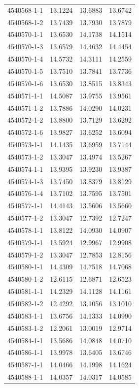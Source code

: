 \begin{longtable}{lrrr}
4540568-1-1 & 13.1224 & 13.6883 & 13.6742 \\
4540568-1-2 & 13.7439 & 13.7930 & 13.7879 \\
4540570-1-1 & 13.6530 & 14.1738 & 14.1514 \\
4540570-1-3 & 13.6579 & 14.4632 & 14.4454 \\
4540570-1-4 & 14.5732 & 14.3111 & 14.2559 \\
4540570-1-5 & 13.7510 & 13.7841 & 13.7736 \\
4540570-1-6 & 13.6530 & 13.8515 & 13.8343 \\
4540571-1-1 & 14.5087 & 13.9755 & 13.9561 \\
4540571-1-2 & 13.7886 & 14.0290 & 14.0231 \\
4540572-1-2 & 13.8800 & 13.7129 & 13.6292 \\
4540572-1-6 & 13.9827 & 13.6252 & 13.6094 \\
4540573-1-1 & 14.1435 & 13.6959 & 13.7144 \\
4540573-1-2 & 13.3047 & 13.4974 & 13.5267 \\
4540574-1-1 & 13.9395 & 13.9230 & 13.9387 \\
4540574-1-3 & 13.7450 & 13.8379 & 13.8129 \\
4540576-1-4 & 13.7102 & 13.7595 & 13.7501 \\
4540577-1-1 & 14.4143 & 13.5606 & 13.5660 \\
4540577-1-2 & 13.3047 & 12.7392 & 12.7247 \\
4540578-1-1 & 13.8122 & 14.0930 & 14.0907 \\
4540579-1-1 & 13.5924 & 12.9967 & 12.9908 \\
4540579-1-2 & 13.3047 & 12.7853 & 12.8156 \\
4540580-1-1 & 14.4309 & 14.7518 & 14.7068 \\
4540580-1-2 & 12.6115 & 12.6871 & 12.6523 \\
4540581-1-1 & 14.2329 & 14.1128 & 14.1161 \\
4540582-1-2 & 12.4292 & 13.1056 & 13.1010 \\
4540583-1-1 & 13.6756 & 14.1333 & 14.0990 \\
4540583-1-2 & 12.2061 & 13.0019 & 12.9714 \\
4540584-1-1 & 13.5686 & 14.0848 & 14.0710 \\
4540586-1-1 & 13.9978 & 13.6405 & 13.6746 \\
4540587-1-1 & 14.0466 & 14.1998 & 14.1624 \\
4540588-1-1 & 14.0357 & 14.0317 & 14.0585 \\

\end{longtable}
